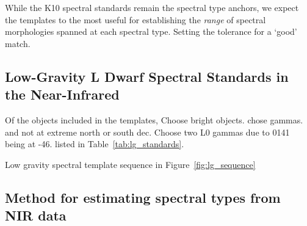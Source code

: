 \documentclass[12pt,preprint]{aastex}
\begin{document}
While the K10 spectral standards remain the spectral type anchors, we expect the templates to the most useful for establishing the \emph{range} of spectral morphologies spanned at each spectral type.
Setting the tolerance for a `good' match.


\subsection{Low-Gravity L Dwarf Spectral Standards in the Near-Infrared}

Of the objects included in the templates, 
Choose bright objects. 
chose gammas.
and not at extreme north or south dec. Choose two L0 gammas due to 0141 being at -46.
listed in Table~\ref{tab:lg_standards}.

Low gravity spectral template sequence in Figure~\ref{fig:lg_sequence}


\subsection{Method for estimating spectral types from NIR data}
\end{document}
